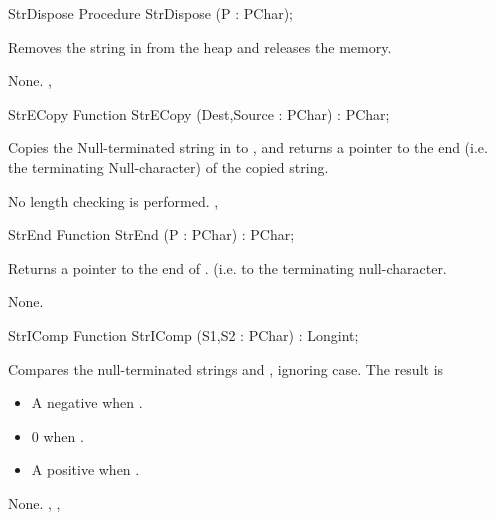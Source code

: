\html{}
\begin{procedure}{StrDispose}
\Declaration
Procedure StrDispose (P : PChar);

\Description

Removes the string in  from the heap and releases the memory.

\Errors
None.
\SeeAlso
{}, 
\end{procedure}
\html{}
\begin{function}{StrECopy}
\Declaration
Function StrECopy (Dest,Source : PChar) : PChar;

\Description

Copies the Null-terminated string in  to , and
returns a pointer to the end (i.e. the terminating Null-character) of the
copied string.

\Errors
No length checking is performed.
\SeeAlso
{}, 
\end{function}
\html{}
\begin{function}{StrEnd}
\Declaration
Function StrEnd (P : PChar) : PChar;

\Description

Returns a pointer to the end of . (i.e. to the terminating
null-character.

\Errors
None.
\SeeAlso
{}
\end{function}
\html{}
\begin{function}{StrIComp}
\Declaration
Function StrIComp (S1,S2 : PChar) : Longint;

\Description

Compares the null-terminated strings  and , ignoring case.
The result is 
\begin{itemize}
\item A negative  when .
\item 0 when .
\item A positive  when .
\end{itemize}

\Errors
None.
\SeeAlso
{}, , 
\end{function}
\html{}
